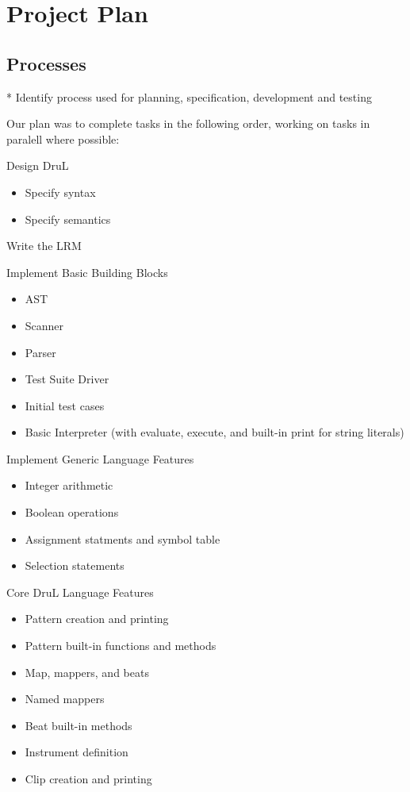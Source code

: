 \chapter{Project Plan}

\section{Processes}
* Identify process used for planning, specification, development and testing

Our plan was to complete tasks in the following order, working on tasks in paralell where possible:

\begin{enumeration}

\item Design DruL
\begin{itemize}
	\item Specify syntax
	\item Specify semantics
\end{itemize}

\item Write the LRM

\item Implement Basic Building Blocks
\begin{itemize}
	\item AST
	\item Scanner
	\item Parser
	\item Test Suite Driver
	\item Initial test cases
	\item Basic Interpreter (with evaluate, execute, and built-in print for string literals)
\end{itemize}

\item Implement Generic Language Features
\begin{itemize}
	\item Integer arithmetic
	\item Boolean operations
	\item Assignment statments and symbol table
	\item Selection statements
\end{itemize}

\item Core DruL Language Features
\begin{itemize}
	\item Pattern creation and printing
	\item Pattern built-in functions and methods
	\item Map, mappers, and beats
	\item Named mappers
	\item Beat built-in methods
	\item Instrument definition
	\item Clip creation and printing
\end{itemize}


\end{enumeration}
